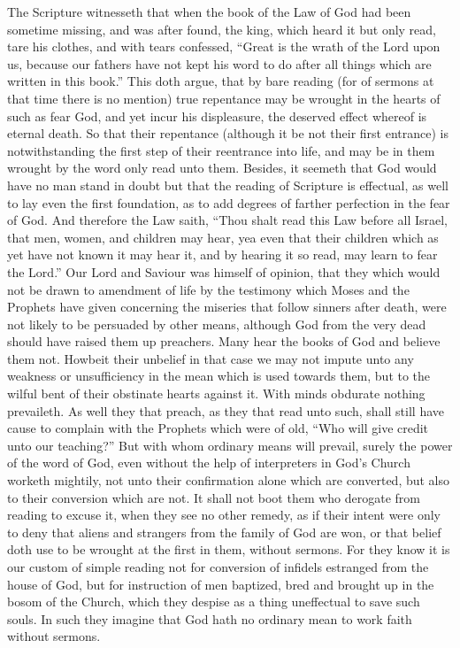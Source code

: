 The Scripture witnesseth that when the book of the  Law of God had been sometime missing, and was after found, the king, which heard it but only read, tare his clothes, and with tears confessed, “Great is the wrath of the Lord upon us, because our fathers have not kept his word to do after all things which are written in this book.” This doth argue, that by bare reading (for of sermons at that time there is no mention) true repentance may be wrought in the hearts of such as fear God, and yet incur his displeasure, the deserved effect whereof is eternal death. So that their repentance (although it be not their first entrance) is notwithstanding the first step of their reentrance into life, and may be in them wrought by the word only read unto them.
Besides, it seemeth that God would have no man stand in doubt but that the reading of Scripture is effectual, as well to lay even the first foundation, as to add degrees of farther perfection in the fear of God. And therefore the Law saith, “Thou shalt read this Law before all Israel, that men, women, and children may hear, yea even that their children which as yet have not known it may hear it, and by hearing it so read, may learn to fear the Lord.”
Our Lord and Saviour was himself of opinion, that they which would not be drawn to amendment of life by the testimony which Moses and the Prophets have given concerning the miseries that follow sinners after death, were not likely to be persuaded by other means, although God from the very dead should have raised them up preachers.
Many hear the books of God and believe them not. Howbeit their unbelief in that case we may not impute unto any weakness or unsufficiency in the mean which is used towards them, but to the wilful bent of their obstinate hearts against it. With minds obdurate nothing prevaileth. As well they that preach, as they that read unto such, shall still have cause to complain with the Prophets which were of old, “Who will give credit unto our teaching?” But with whom ordinary means will prevail, surely the power of the word of God, even without the help of interpreters in God’s Church worketh mightily, not unto their confirmation alone which are converted, but also to their conversion which are not.
It shall not boot them who derogate from reading to excuse it, when they see no other remedy, as if their intent were only to deny that aliens and strangers from the family of God are won, or that belief doth use to be wrought at the first in them, without sermons. For they know it is our custom of simple reading not for conversion of infidels estranged from the house of God, but for instruction of men baptized, bred and brought up in the bosom of the Church, which they despise as a thing uneffectual to save such souls. In such they imagine that God hath no ordinary mean to work faith without sermons.
